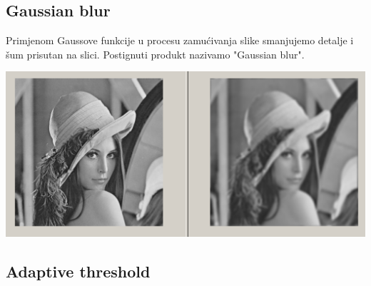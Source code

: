 \documentclass{article}
\begin{document}
\subsection{Gaussian blur}

Primjenom Gaussove funkcije u procesu zamućivanja slike smanjujemo detalje i šum prisutan na slici. Postignuti produkt nazivamo "Gaussian blur". %
\begin{center}
    \includegraphics[scale=0.25]{gauss.png}
\end{center}

\subsection{Adaptive threshold}
\end{document}
